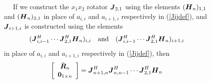 \begin{figure}
{\begin{minipage} {140.0mm}
$\quad$ If we construct the $x_1 x_2$ rotator ${\bmi J}_{2,1}$ using the 
elements 
$({\bmi H}_{n})_{1,1}$ and $({\bmi H}_{n})_{2,1}$ in place of  ${a}_{i,i}$ 
and 
${a}_{i+1,i}$ respectively in (\ref{Jijdef}), and ${\bmi J}_{i+1,i}$ is 
constructed using the elements
\[
({\bmi J}^{H}_{i,i-1}\cdots {\bmi J}^{H}_{2,1}{\bmi H}_{n})_{i,i} \quad 
\mbox{and} \quad 
({\bmi J}^{H}_{i,i-1}\cdots {\bmi J}^{H}_{2,1}{\bmi H}_{n})_{i+1,i}
\]
in place of  ${a}_{i,i}$ and ${a}_{i+1,i}$ respectively in 
(\ref{Jijdef}), then
\[
\left[ \begin{array}{c}
\bar{\bmi R}_{n}\\{\bf 0}_{1 \times n}\end{array} \right]=
{\bmi J}^{H}_{n+1,n}{\bmi J}^{H}_{n,n-1}\cdots {\bmi J}^{H}_{2,1}{\bmi 
H}_{n}
\]

\vspace{6 mm}
\end{minipage}
}
\end{figure}



